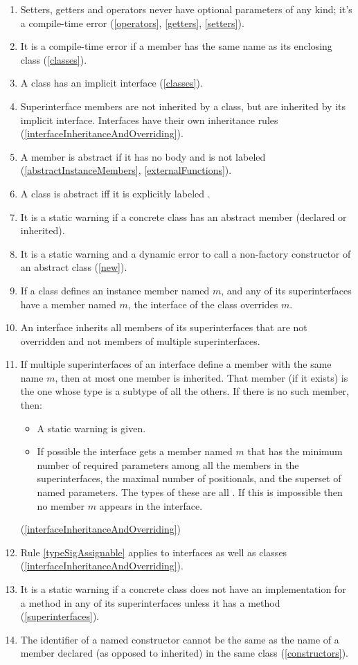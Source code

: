 \documentclass{article}
\begin{document}
{\begin{enumerate}
\item Setters, getters and operators never have optional parameters of any kind; it's a compile-time error (\ref{operators}, \ref{getters}, \ref{setters}).
\item It is a compile-time error if a member has the same name as its enclosing class (\ref{classes}).
\item A class has an implicit interface (\ref{classes}). 
\item Superinterface members are not inherited by a class, but are inherited by its implicit interface. Interfaces have their own inheritance rules (\ref{interfaceInheritanceAndOverriding}).
\item A member is abstract if it has no body and is not labeled \EXTERNAL{} (\ref{abstractInstanceMembers}, \ref{externalFunctions}).
\item A class is abstract iff it is explicitly labeled \ABSTRACT{}.%
\item It is a static warning if a concrete class has an abstract member (declared or inherited).
\item It is a static warning and a dynamic error to call a non-factory constructor of an abstract class  (\ref{new}). 
\item If a class defines an instance member named $m$, and any of its superinterfaces have a  member named $m$, the interface of the class overrides $m$.
\item  An interface inherits all  members of its superinterfaces that are not overridden and not members of multiple superinterfaces.
\item  If multiple superinterfaces of an interface define a member with the same name $m$, then at most one member is inherited. That member (if it exists) is the one whose type is a subtype of all the others. If there is no such member, then:
\begin{itemize}
  \item  A static warning is given.
  \item  If possible the interface gets a member named $m$ that has the minimum number of required parameters among all the members in the superinterfaces, the maximal number of    positionals, and the superset of named parameters.  The types of these are all \DYNAMIC{}. If this is impossible then no member $m$ appears in the interface.
  \end{itemize}  (\ref{interfaceInheritanceAndOverriding})
\item  Rule \ref{typeSigAssignable} applies to interfaces as well as classes  (\ref{interfaceInheritanceAndOverriding}).
\item  It is a static warning if a concrete class does not have an implementation for a  method in any of its superinterfaces  unless it has a  method (\ref{superinterfaces}). 
\item The identifier of a named constructor cannot be the same as the name of a member declared (as opposed to inherited) in the same class (\ref{constructors}).
\end{enumerate}
}
\end{document}
